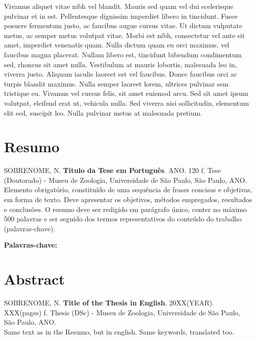 \documentclass[12pt,twoside,a4paper]{book}
\begin{document}
Vivamus aliquet vitae nibh vel blandit. Mauris sed quam vel dui scelerisque pulvinar et in est. Pellentesque dignissim imperdiet libero in tincidunt. Fusce posuere fermentum justo, ac faucibus augue cursus vitae. Ut dictum vulputate metus, ac semper metus volutpat vitae. Morbi est nibh, consectetur vel ante sit amet, imperdiet venenatis quam. Nulla dictum quam eu orci maximus, vel faucibus magna placerat. Nullam libero est, tincidunt bibendum condimentum sed, rhoncus sit amet nulla. Vestibulum at mauris lobortis, malesuada leo in, viverra justo. Aliquam iaculis laoreet est vel faucibus. Donec faucibus orci ac turpis blandit maximus. Nulla semper laoreet lorem, ultrices pulvinar sem tristique eu. Vivamus vel cursus felis, sit amet euismod arcu. Sed sit amet ipsum volutpat, eleifend erat ut, vehicula nulla. Sed viverra nisi sollicitudin, elementum elit sed, suscipit leo. Nulla pulvinar metus at malesuada pretium. 

\chapter*{Resumo}

\noindent SOBRENOME, N. \textbf{Titulo da Tese em Português}. 
ANO. 120 f. %
Tese (Doutorado) - Museu de Zoologia,
Universidade de São Paulo, São Paulo, ANO.
\\

Elemento obrigatório, constituído de uma sequência de frases concisas e
objetivas, em forma de texto.  Deve apresentar os objetivos, métodos empregados,
resultados e conclusões.  O resumo deve ser redigido em parágrafo único, conter
no máximo 500 palavras e ser seguido dos termos representativos do conteúdo do
trabalho (palavras-chave). 

\noindent \textbf{Palavras-chave:} 

\chapter*{Abstract}
\noindent SOBRENOME, N. \textbf{Title of the Thesis in English}. 
20XX(YEAR). XXX(pages) f.
Thesis (DSc) - Museu de Zoologia,
Universidade de São Paulo, São Paulo, ANO.
\\

Same text as in the Resumo, but in english. Same keywords, translated too.
\\
\end{document}
